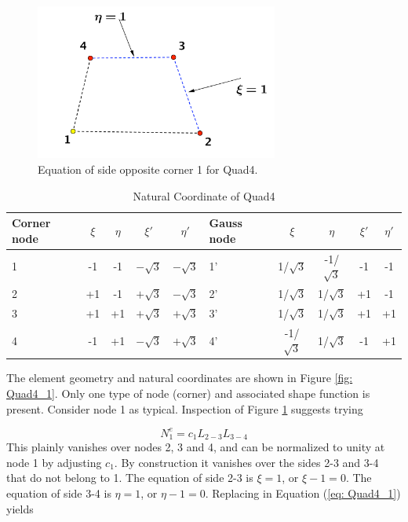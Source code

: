 \begin{figure}[h]
	\begin{center}
		\includegraphics[width=8cm,clip]{Quad4_2.pdf}			
		\caption{Equation of side opposite corner 1 for Quad4.} \label{fig: Quad4_2}
	\end{center} 
\end{figure}

\begin{table}
	\centering
	\caption{Natural Coordinate of Quad4}
	\label{tab: Quad4}
	\begin{tabular}{p{1cm}ccccp{1cm}cccc}			
		\hline
		Corner node\centering& $\xi$& $\eta$& $\xi'$& $\eta'$& Gauss node\centering& $\xi$& $\eta$& $\xi'$& $\eta'$ \\
		\hline
		1\centering& -1& -1& $-\sqrt{3}$& $-\sqrt{3}$& 1'\centering& 1/$\sqrt{3}$& -1/$\sqrt{3}$& -1& -1 \\
		2\centering& +1& -1& $+\sqrt{3}$& $-\sqrt{3}$& 2'\centering& 1/$\sqrt{3}$& 1/$\sqrt{3}$& +1& -1 \\
		3\centering& +1& +1& $+\sqrt{3}$& $+\sqrt{3}$& 3'\centering& 1/$\sqrt{3}$& 1/$\sqrt{3}$& +1& +1\\
		4\centering& -1& +1& $-\sqrt{3}$& $+\sqrt{3}$& 4'\centering& -1/$\sqrt{3}$& 1/$\sqrt{3}$& -1& +1\\
		\hline
	\end{tabular}
\end{table}		


The element geometry and natural coordinates are shown in Figure \ref{fig: Quad4_1}. Only one type of node (corner)  and associated shape function is present. Consider node 1 as typical. Inspection of Figure \ref{fig: Quad4_2} suggests trying

\begin{equation} \label{eq: Quad4_1}
N_1^e = c_1L_{2-3}L_{3-4}
\end{equation}
This plainly vanishes over nodes 2, 3 and 4, and can be normalized to unity at node 1 by adjusting $c_1$. By construction it vanishes over the sides 2-3 and 3-4 that do not belong to 1. The equation of side 2-3 is $\xi = 1$, or $\xi - 1 = 0$. The equation of side 3-4 is $\eta = 1$, or $\eta - 1 = 0$. Replacing in Equation (\ref{eq: Quad4_1}) yields

